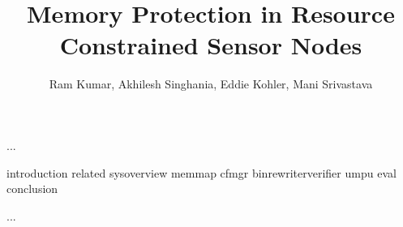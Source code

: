 \documentclass[acmtecs,acmnow]{acmtrans2m}
\title{Memory Protection in Resource Constrained Sensor Nodes}
\author{Ram Kumar, Akhilesh Singhania, Eddie Kohler, Mani Srivastava}
\begin{document}
            
\begin{bottomstuff} 
...
\end{bottomstuff}
            
\maketitle


 {introduction}
 {related}
 {sysoverview}
 {memmap}
 {cfmgr}
 {binrewriterverifier}
 {umpu}
 {eval}
 {conclusion}






\begin{received}
...
\end{received}
\end{document}
